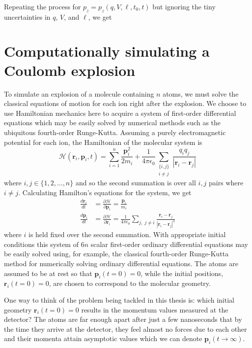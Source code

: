 Repeating the process for $p_z = p_z(q,V,\ell,t_0,t)$ but ignoring the tiny uncertainties in $q$, $V$, and $\ell$, we get

\section{Computationally simulating a Coulomb explosion} \label{sec:simulating}
To simulate an explosion of a molecule containing $n$ atoms, we must solve the classical equations of motion for each ion right after the explosion. We choose to use Hamiltonian mechanics here to acquire a system of first-order differential equations which may be easily solved by numerical methods such as the ubiquitous fourth-order Runge-Kutta. Assuming a purely electromagnetic potential for each ion, the Hamiltonian of the molecular system is
\begin{equation}
\mathcal{H}(\mathbf{r}_i, \mathbf{p}_i, t) = \sum_{i=1}^n \frac{\mathbf{p}_i^2}{2m_i} + \frac{1}{4\pi\epsilon_0}\sum_{\substack{\lbrace i,j\rbrace\\ i \ne j}} \frac{q_iq_j}{|\mathbf{r}_i-\mathbf{r}_j|}
\end{equation}
where $i,j \in \lbrace 1,2,\dots, n \rbrace$ and so the second summation is over all $i,j$ pairs where $i \ne j$. Calculating Hamilton's equations for the system, we get
\begin{subequations}
  \begin{align}
  \frac{d\mathbf{r}_i}{dt} &= \frac{\partial \mathcal{H}}{\partial \mathbf{p}_i} = \frac{\mathbf{p}_i}{m_i} \\
  \frac{d\mathbf{p}_i}{dt} &= \frac{\partial \mathcal{H}}{\partial \mathbf{r}_i} = \frac{1}{4\pi\epsilon_0}\sum_{j, \; j \ne i} \frac{\mathbf{r}_i - \mathbf{r}_j}{|\mathbf{r}_i - \mathbf{r}_j|^3}
  \end{align}
\end{subequations}
where $i$ is held fixed over the second summation. With appropriate initial conditions this system of $6n$ scalar first-order ordinary differential equations may be easily solved using, for example, the classical fourth-order Runge-Kutta method for numerically solving ordinary differential equations. The atoms are assumed to be at rest so that $\mathbf{p}_i(t=0) = 0$, while the initial positions, $\mathbf{r}_i(t=0) = 0$, are chosen to correspond to the molecular geometry. 

One way to think of the problem being tackled in this thesis is: which initial geometry $\mathbf{r}_i(t=0) = 0$ results in the momentum values measured at the detector? The atoms are far enough apart after just a few nanoseconds that by the time they arrive at the detector, they feel almost no forces due to each other and their momenta attain asymptotic values which we can denote $\mathbf{p}_i(t\rightarrow\infty)$.


